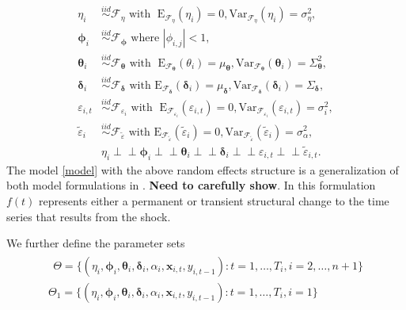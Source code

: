 \documentclass[11pt]{article}
\def\mbf#1{\mathbf{#1}} %
\newcommand{\simiid}{\stackrel{iid}{\sim}} %
\newcommand{\indep}{\perp \!\!\! \perp } %
\def\mrm#1{\mathrm{#1}} %
\def\t#1{\tilde{#1}} %
\def\mc#1{\mathcal{#1}} %
\def\mc#1{\mathcal{#1}}
\theoremstyle{definition}
\begin{document}
\begin{align*}
  \eta_i &\simiid \mc{F}_{\eta} \text{ with }  \; \mrm{E}_{\mc{F}_{\eta}}(\eta_i) = 0, \mrm{Var}_{\mc{F}_{\eta}}(\eta_i)  = \sigma^2_{\eta}, \\
  \mathbf{\phi}_i &\simiid \mc{F}_{\mathbf{\phi}} \text{ where } |\phi_{i,j}| < 1, \\
  \mathbf{\theta}_i &\simiid \mc{F}_{\mathbf{\theta}} \text{ with }  \; \mrm{E}_{\mc{F}_{\mathbf{\theta}}}(\theta_i) = \mu_{\mathbf{\theta}}, \mrm{Var}_{\mc{F}_{\mathbf{\theta}}}(\mathbf{\theta}_i)  = \Sigma^2_{\mathbf{\theta}}, \\
  \mathbf{\delta}_i &\simiid  \mc{F}_{\mathbf{\delta}} \text{ with } \mrm{E}_{\mc{F}_{\mathbf{\delta}}}(\mathbf{\delta}_i)=\mu_{\mathbf{\delta}}, \mrm{Var}_{\mc{F}_{\mathbf{\delta}}}(\mathbf{\delta}_i)=\Sigma_{\mathbf{\delta}}, \\
\varepsilon_{i,t} & \simiid  \mc{F}_{\varepsilon_i} \text{ with }  \; \mrm{E}_{\mc{F}_{\varepsilon_i}}(\varepsilon_{i,t}) = 0, \mrm{Var}_{\mc{F}_{\varepsilon_i}}(\varepsilon_{i,t})  = \sigma^2_i,  \\
\t{\varepsilon}_{i} &\simiid  \mc{F}_{\t{\varepsilon}} \text{ with }\mrm{E}_{\mc{F}_{\t{\varepsilon}}}(\t{\varepsilon}_{i})=0, \mrm{Var}_{\mc{F}_{\t{\varepsilon}}}(\t{\varepsilon}_{i})=\sigma^2_{\alpha}, \\
&\eta_i \indep \mathbf{\phi}_i \indep \mathbf{\theta}_i \indep 
\mathbf{\delta}_i \indep \varepsilon_{i,t} \indep \tilde\varepsilon_{i,t}.
\end{align*}
The model \eqref{model} with the above random effects structure is a generalization of both model formulations in \cite{lin2021minimizing}. \textbf{Need to carefully show}. In this formulation $f(t)$ represents either a permanent or transient structural change to the time series that results from the shock.

We further define the parameter sets
\begin{align}
\begin{array}{l}
 \;\, \Theta = \{(\eta_i, \mathbf{\phi}_i, \mathbf{\theta}_i, \mathbf{\delta}_i, \alpha_i, \mbf{x}_{i,t}, y_{i,t-1})\colon    t= 1, \ldots, T_i, i = 2, \ldots, n +1\} \\
   \Theta_1 = \{(\eta_i, \mathbf{\phi}_i, \mathbf{\theta}_i, \mathbf{\delta}_i, \alpha_i, \mbf{x}_{i,t}, y_{i,t-1})\colon  t= 1, \ldots, T_i, i = 1\}
\end{array}\label{parameter} 
\end{align}
\end{document}
